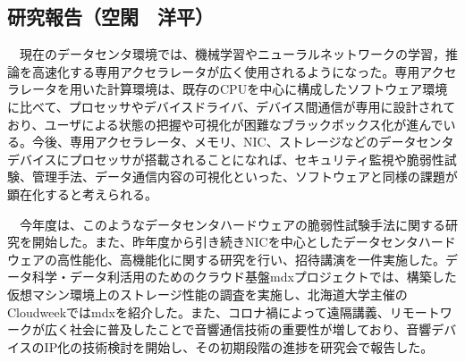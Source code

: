 \subsection{研究報告（空閑　洋平）}
　現在のデータセンタ環境では、機械学習やニューラルネットワークの学習，推論を高速化する専用アクセラレータが広く使用されるようになった。専用アクセラレータを用いた計算環境は、既存のCPUを中心に構成したソフトウェア環境に比べて、プロセッサやデバイスドライバ、デバイス間通信が専用に設計されており、ユーザによる状態の把握や可視化が困難なブラックボックス化が進んでいる。今後、専用アクセラレータ、メモリ、NIC、ストレージなどのデータセンタデバイスにプロセッサが搭載されることになれば、セキュリティ監視や脆弱性試験、管理手法、データ通信内容の可視化といった、ソフトウェアと同様の課題が顕在化すると考えられる。

　今年度は、このようなデータセンタハードウェアの脆弱性試験手法に関する研究を開始した。また、昨年度から引き続きNICを中心としたデータセンタハードウェアの高性能化、高機能化に関する研究を行い\cite{ykuga33191433, ykuga32183289, ykuga36595746}、招待講演を一件実施した\cite{ykuga36619729}。データ科学・データ利活用のためのクラウド基盤mdxプロジェクトでは、構築した仮想マシン環境上のストレージ性能の調査を実施\cite{ykuga36616798}し、北海道大学主催のCloudweekではmdxを紹介した\cite{ykuga36619767}。また、コロナ禍によって遠隔講義、リモートワークが広く社会に普及したことで音響通信技術の重要性が増しており、音響デバイスのIP化の技術検討を開始し、その初期段階の進捗を研究会で報告した\cite{ykuga36616852}。